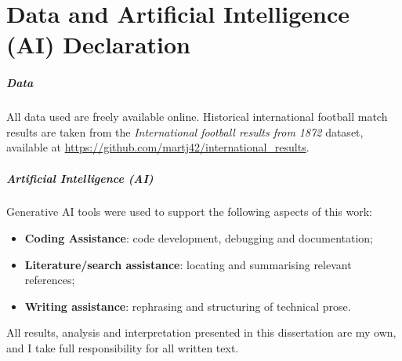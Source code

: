 \chapter*{Data and Artificial Intelligence (AI) Declaration}

\paragraph{Data}
All data used are freely available online. Historical international football match results are taken from the \emph{International football results from 1872} dataset, available at \url{https://github.com/martj42/international_results}.

\paragraph{Artificial Intelligence (AI)} 

Generative AI tools were used to support the following aspects of this work:

\begin{itemize}
    \item \textbf{Coding Assistance}: code development, debugging and documentation;
    \item \textbf{Literature/search assistance}: locating and summarising relevant references;
    \item \textbf{Writing assistance}: rephrasing and structuring of technical prose.
\end{itemize}

All results, analysis and interpretation presented in this dissertation are my own, and I take full responsibility for all written text.